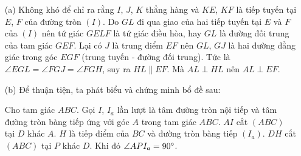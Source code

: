     \begin{solution}
        \hfill
        \begin{enumerate}
            \item[(a)] Không khó để chỉ ra rằng \(I\), \(J\), \(K\) thẳng hàng và \(KE\), \(KF\) là tiếp tuyến tại \(E\), \(F\) của đường tròn \((I)\). Do \(GL\) đi qua giao của hai tiếp tuyến tại \(E\) và \(F\) của \((I)\) nên tứ giác \(GELF\) là tứ giác điều hòa, hay \(GL\) là đường đối trung của tam giác \(GEF\). Lại có \(J\) là trung điểm \(EF\) nên \(GL\), \(GJ\) là hai đường đẳng giác trong góc \(EGF\) (trung tuyến - đường đối trung). Tức là \(\angle EGL = \angle FGJ = \angle FGH\), suy ra \(HL \parallel EF\). Mà \(AL \perp HL\) nên \(AL \perp EF\).
            \item[(b)] Để thuận tiện, ta phát biểu và chứng minh bổ đề sau:
            \begin{lemma}
                Cho tam giác \(ABC\). Gọi \(I\), \(I_a\) lần lượt là tâm đường tròn nội tiếp và tâm đường tròn bàng tiếp ứng với góc \(A\) trong tam giác \(ABC\). \(AI\) cắt \((ABC)\) tại \(D\) khác \(A\). \(H\) là tiếp điểm của \(BC\) và đường tròn bàng tiếp \((I_a)\). \(DH\) cắt \((ABC)\) tại \(P\) khác \(D\). Khi đó \(\angle API_a = 90 \degree\).
            \end{lemma}
            \begin{center}
\end{center}
\end{enumerate}
\end{solution}
